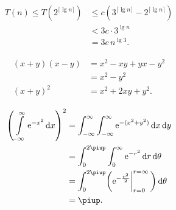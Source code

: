 \documentclass[12pt, a4paper, oneside]{article}
\newcommand{\mathup}[1]{\mathrm{#1}}
\theoremstyle{Plain}
\theoremstyle{Definition}
\theoremstyle{Remark}
\begin{document}
\begin{appendix}

\begin{align*}
T(n)\le T(2^{\lceil\lg n\rceil})
&\le c(3^{\lceil\lg n\rceil}-2^{\lceil\lg n\rceil})\\
&<3c\cdot3^{\lg n}\\
&=3c\,n^{\lg3}.
\end{align*}



\begin{align*}
\begin{aligned}
(x+y)(x-y)&=x^2-xy+yx-y^2\\
&=x^2-y^2\\
(x+y)^2&=x^2+2xy+y^2.
\end{aligned}
\end{align*}


\begin{align*}
\begin{aligned}
\left( \int\limits_{-\infty}^\infty \mathup{e}^{-x^2}\,\mathup{d}x \right)^2
&=\int_{-\infty}^\infty\int_{-\infty}^\infty \mathup{e}^{-(x^2+y^2)}\,\mathup{d}x\,\mathup{d}y\\
&=\int_0^{2\piup}\int_0^\infty \mathup{e}^{-r^2}\,\mathup{d}r\,\mathup{d}\theta\\
&=\int_0^{2\piup}\biggl(\mathup{e}^{-\frac{r^2}{2}}\biggl|_{r=0}^{r=\infty}\,\biggr)\,\mathup{d}\theta\\
&=\piup.
\end{aligned}
\end{align*}



\end{appendix}
\end{document}
